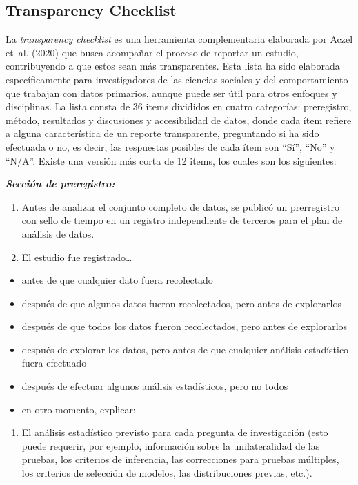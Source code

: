 \documentclass[
  spanish,
  letterpaper,
  DIV=11,
  numbers=noendperiod]{scrreprt}
\providecommand{\tightlist}{%
  \setlength{\itemsep}{0pt}\setlength{\parskip}{0pt}}
\begin{document}
\subsection{Transparency Checklist}\label{transparency-checklist}

La \emph{transparency checklist} es una herramienta complementaria
elaborada por Aczel et~al. (2020) que busca acompañar el proceso de
reportar un estudio, contribuyendo a que estos sean más transparentes.
Esta lista ha sido elaborada específicamente para investigadores de las
ciencias sociales y del comportamiento que trabajan con datos primarios,
aunque puede ser útil para otros enfoques y disciplinas. La lista consta
de 36 items divididos en cuatro categorías: preregistro, método,
resultados y discusiones y accesibilidad de datos, donde cada ítem
refiere a alguna característica de un reporte transparente, preguntando
si ha sido efectuada o no, es decir, las respuestas posibles de cada
ítem son ``Sí'', ``No'' y ``N/A''. Existe una versión más corta de 12
items, los cuales son los siguientes:

\textbf{\emph{Sección de preregistro:}}

\begin{enumerate}
\def\labelenumi{(\arabic{enumi})}
\item
  Antes de analizar el conjunto completo de datos, se publicó un
  prerregistro con sello de tiempo en un registro independiente de
  terceros para el plan de análisis de datos.
\item
  El estudio fue registrado\ldots{}
\end{enumerate}

\begin{itemize}
\tightlist
\item
  antes de que cualquier dato fuera recolectado
\item
  después de que algunos datos fueron recolectados, pero antes de
  explorarlos
\item
  después de que todos los datos fueron recolectados, pero antes de
  explorarlos
\item
  después de explorar los datos, pero antes de que cualquier análisis
  estadístico fuera efectuado
\item
  después de efectuar algunos análisis estadísticos, pero no todos
\item
  en otro momento, explicar:
\end{itemize}

\begin{enumerate}
\def\labelenumi{(\arabic{enumi})}
\setcounter{enumi}{2}
\tightlist
\item
  El análisis estadístico previsto para cada pregunta de investigación
  (esto puede requerir, por ejemplo, información sobre la unilateralidad
  de las pruebas, los criterios de inferencia, las correcciones para
  pruebas múltiples, los criterios de selección de modelos, las
  distribuciones previas, etc.).
\end{enumerate}
\end{document}
